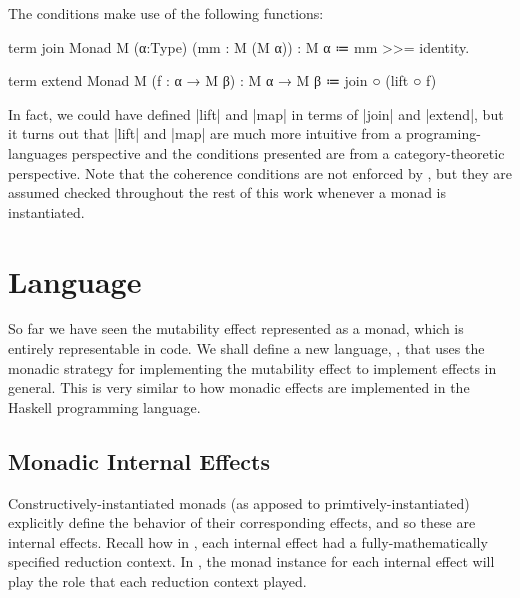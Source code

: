 The conditions make use of the following functions:
\begin{program}
term join {Monad M} (α:Type) (mm : M (M α)) : M α
  ≔ mm >>= identity.

term extend {Monad M} (f : α → M β) : M α → M β
  ≔ join ○ (lift ○ f)
\end{program}
In fact, we could have defined \code|lift| and \code|map| in terms of \code|join| and \code|extend|, but it turns out that \code|lift| and \code|map| are much more intuitive from a programing-languages perspective and the conditions presented are from a category-theoretic perspective.
Note that the coherence conditions are not enforced by \LangC, but they are assumed checked throughout the rest of this work whenever a monad is instantiated.

\section{Language \LangC}
\label{sec:LangC}

So far we have seen the mutability effect represented as a monad, which is entirely representable in \LangA code.
We shall define a new language, \LangC, that uses the monadic strategy for implementing the mutability effect to implement effects in general.
This is very similar to how monadic effects are implemented in the Haskell programming language.

\subsection{Monadic Internal Effects}

Constructively-instantiated monads (as apposed to primtively-instantiated) explicitly define the behavior of their corresponding effects, and so these are internal effects.
Recall how in \LangB, each internal effect had a fully-mathematically specified reduction context.
In \LangC, the monad instance for each internal effect will play the role that each \LangB reduction context played.

